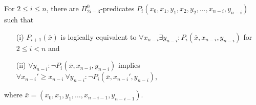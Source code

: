 \documentclass[envcountsame]{llncs}
\begin{document}
\begin{lemma}\label{lem:normalform}
  For $2\leq i\leq n$, there are $\Pi^0_{2i-3}$-predicates
  $P_i(x_0,x_1,y_1,x_2,y_2,\ldots,x_{n-i},y_{n-i})$ such that
  \begin{enumerate}
  \item[(i)] $P_{i+1}(\overline x)$ is logically equivalent to
    $\forall x_{n-i}\exists y_{n-i}: P_i(\overline x,x_{n-i},y_{n-i})$
    for $2 \leq i < n$ and
  \item[(ii)] $\forall y_{n-i} : \neg P_i(\overline{x},x_{n-i},y_{n-i})$
    implies $\forall x_{n-i}'\geq x_{n-i}\ \forall y_{n-i} : \neg
    P_i(\overline{x},x_{n-i}',y_{n-i})$,
  \end{enumerate}
  where $\overline x=(x_0,x_1,y_1,\dots,x_{n-i-1},y_{n-i-1})$.
\end{lemma}
\end{document}
